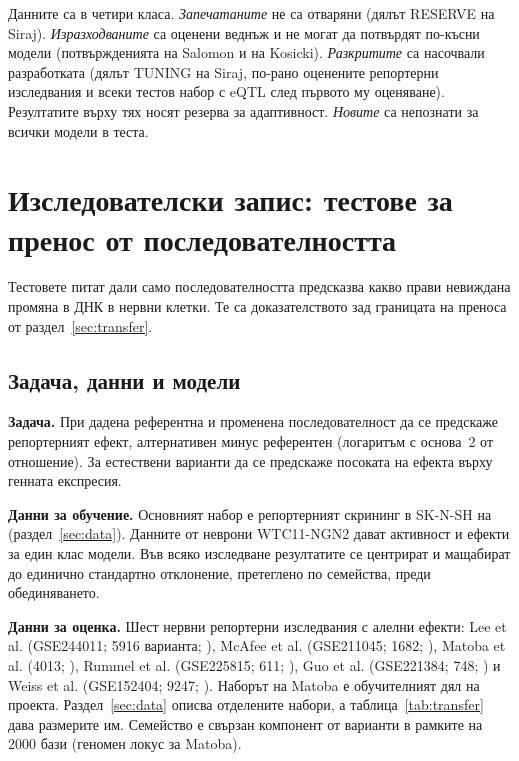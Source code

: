 \documentclass[10.5pt,a4paper]{article}
\begin{document}
Данните са в четири класа. \emph{Запечатаните} не са отваряни (дялът RESERVE на Siraj). \emph{Изразходваните} са оценени веднъж и не могат да потвърдят по-късни модели (потвържденията на Salomon и на Kosicki). \emph{Разкритите} са насочвали разработката (дялът TUNING на Siraj, по-рано оценените репортерни изследвания и всеки тестов набор с eQTL след първото му оценяване). Резултатите върху тях носят резерва за адаптивност. \emph{Новите} са непознати за всички модели в теста.

\section{Изследователски запис: тестове за пренос от последователността}\label{app:record}

Тестовете питат дали само последователността предсказва какво прави невиждана промяна в ДНК в нервни клетки. Те са доказателството зад границата на преноса от раздел~\ref{sec:transfer}.

\subsection{Задача, данни и модели}

\textbf{Задача.} При дадена референтна и променена последователност да се предскаже репортерният ефект, алтернативен минус референтен (логаритъм с основа~2 от отношение). За естествени варианти да се предскаже посоката на ефекта върху генната експресия.

\textbf{Данни за обучение.} Основният набор е репортерният скрининг в SK-N-SH на \citet{siraj2026} (раздел~\ref{sec:data}). Данните от неврони WTC11-NGN2 \citep{salomon2026} дават активност и ефекти за един клас модели. Във всяко изследване резултатите се центрират и мащабират до единично стандартно отклонение, претеглено по семейства, преди обединяването.

\textbf{Данни за оценка.} Шест нервни репортерни изследвания с алелни ефекти: Lee et al. (GSE244011; 5916 варианта; \citealt{lee2025}), McAfee et al. (GSE211045; 1682; \citealt{mcafee2023}), Matoba et al. (4013; \citealt{matoba2026}), Rummel et al. (GSE225815; 611; \citealt{rummel2023}), Guo et al. (GSE221384; 748; \citealt{guo2023}) и Weiss et al. (GSE152404; 9247; \citealt{weiss2021}). Наборът на Matoba е обучителният дял на проекта. Раздел~\ref{sec:data} описва отделените набори, а таблица~\ref{tab:transfer} дава размерите им. Семейство е свързан компонент от варианти в рамките на 2000 бази (геномен локус за Matoba).
\end{document}
